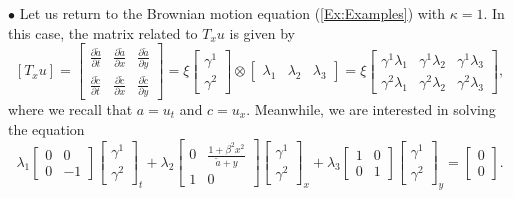 \documentclass{birkjour}
\theoremstyle{definition}
\theoremstyle{remark}
\numberwithin{equation}{section}
\numberwithin{equation}{section}
\numberwithin{thm}{section}
\numberwithin{equation}{section}
\numberwithin{thm}{section}
\begin{document}
$\bullet$ Let us return to the Brownian motion equation (\ref{Ex:Examples}) with $\kappa=1$. In this case, the matrix related to $T_xu$ is given by
$$
[T_xu]=\left[ \begin{matrix} \frac {\partial \widetilde{a}} {\partial t}& \frac {\partial \widetilde{a}} {\partial x}& \frac {\partial \widetilde{a}} {\partial y}\\ \frac {\partial \widetilde {c}} {\partial t}& \frac {\partial \widetilde {c}} {\partial x}& \frac {\partial \widetilde{c}} {\partial y}\end{matrix} \right] =\xi \left[ \begin{matrix} \gamma^{1}\\ \gamma^{2}\end{matrix} \right] \otimes \left[ \begin{matrix} \lambda _{1}& \lambda _{2}& \lambda _{3}\end{matrix} \right] =\xi \left[ \begin{matrix} \gamma^{1}\lambda _{1}& \gamma ^{1}\lambda _{2}& \gamma^{1}\lambda _{3}\\ \gamma ^{2}\lambda _{1}& \gamma ^{2}\lambda_{2}& \gamma^{2}\lambda _{3}\end{matrix} \right],$$
where we recall that $a=u_t$ and $c=u_x$. 
Meanwhile, we are interested in solving the  equation
$$
\lambda_{1}\left[\begin{array}{cc} 0& 0\\ 
	0& -1\end{array} \right] \left[ \begin{array}{c} \gamma^1\\ \gamma^2\end{array} \right] _{t}+\lambda _{2}\left[ \begin{array}{cc} 0&\frac {1+\beta^{2}x^{2}} {\widetilde{a}+y}\\1& 0 \end{array} \right] \left[\begin{array}{c} \gamma^1\\ \gamma^2\end{array}\right] _{x}+\lambda_3\left[ \begin{matrix} 1& 0\\ 0& 1\end{matrix} \right] \left[ \begin{array}{c} \gamma^1\\ \gamma^2\end{array} \right]_y \!\!=\!\!\left[ \begin{matrix} 0\\ 0\end{matrix} \right].
$$
\end{document}
